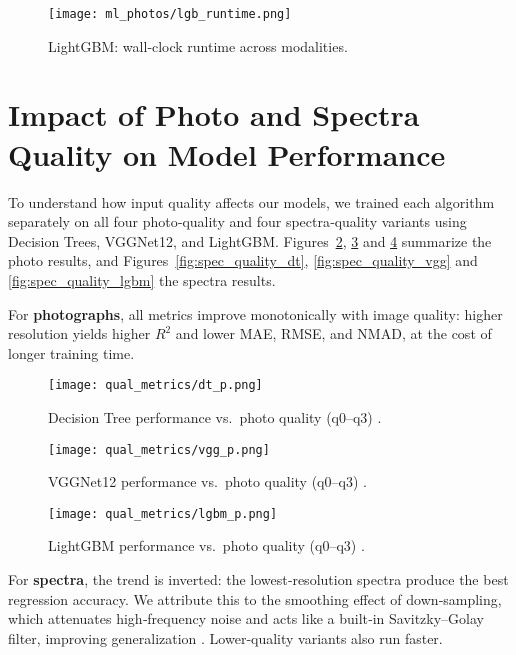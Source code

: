 \documentclass[english,bachelor,oneside]{ctufit-thesis}
\begin{document}
\begin{figure}[H]
  \centering
  \texttt{[image: ml\_photos/lgb\_runtime.png]}
  \caption{LightGBM: wall‐clock runtime across modalities.}
  \label{fig:lgb_runtime}
\end{figure}

\section{Impact of Photo and Spectra Quality on Model Performance}
To understand how input quality affects our models, we trained each algorithm separately on all four photo‐quality and four spectra‐quality variants using Decision Trees, VGGNet12, and LightGBM. Figures~\ref{fig:photo_quality_dt}, \ref{fig:photo_quality_vgg} and \ref{fig:photo_quality_lgbm} summarize the photo results, and Figures~\ref{fig:spec_quality_dt}, \ref{fig:spec_quality_vgg} and \ref{fig:spec_quality_lgbm} the spectra results.

For \textbf{photographs}, all metrics improve monotonically with image quality: higher resolution yields higher $R^2$ and lower MAE, RMSE, and NMAD, at the cost of longer training time.  
\begin{figure}[H]
  \centering
  \texttt{[image: qual\_metrics/dt\_p.png]}
  \caption{Decision Tree performance vs.\ photo quality (q0–q3) \cite{DTq}.}
  \label{fig:photo_quality_dt}
\end{figure}
\begin{figure}[H]
  \centering
  \texttt{[image: qual\_metrics/vgg\_p.png]}
  \caption{VGGNet12 performance vs.\ photo quality (q0–q3) \cite{VGGq}.}
  \label{fig:photo_quality_vgg}
\end{figure}
\begin{figure}[H]
  \centering
  \texttt{[image: qual\_metrics/lgbm\_p.png]}
  \caption{LightGBM performance vs.\ photo quality (q0–q3) \cite{lgbmq}.}
  \label{fig:photo_quality_lgbm}
\end{figure}
For \textbf{spectra}, the trend is inverted: the lowest‐resolution spectra produce the best regression accuracy. We attribute this to the smoothing effect of down‐sampling, which attenuates high‐frequency noise and acts like a built‐in Savitzky–Golay filter, improving generalization \cite{SavitzkyGolay1964}. Lower‐quality variants also run faster.  
\end{document}
